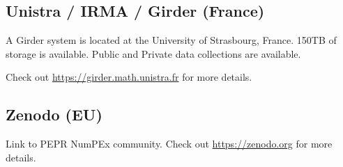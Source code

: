 \subsection*{Unistra / IRMA / Girder (France)}
\label{sec:arch:girder:unistra}

A Girder system is located at the University of Strasbourg, France. 
150TB of storage is available.
Public and Private data collections are available.

Check out \url{https://girder.math.unistra.fr} for more details.

\subsection*{Zenodo (EU)}
\label{sec:arch:zenodo}


Link to PEPR NumPEx community.
Check out \url{https://zenodo.org} for more details.


